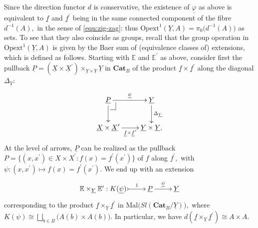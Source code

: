 \documentclass[11pt]{amsart}
\makeatletter
\theoremstyle{plain}
\theoremstyle{definition}
\theoremstyle{remark}
\newcommand{\pullback}[4]{{#1 \leftindex_{#2}{\times}_{#3} #4}}
\newcommand{\un}{\underline}
\def\pullback{%
 \ar@{-}[]+R+<4pt,-3pt>;[]+RD+<4pt,-6pt>%
 \ar@{-}[]+D+<3pt,-6pt>;[]+RD+<4pt,-6pt>}
\def\pullback{%
 \ar@{-}[]+R+<4pt,-3pt>;[]+RD+<4pt,-6pt>%
 \ar@{-}[]+D+<3pt,-6pt>;[]+RD+<4pt,-6pt>}
\makeatother
\begin{document}
Since the direction functor $d$ is conservative, the existence of $\un{\varphi}$ as above is equivalent to $\un{f}$ and $\un{f}^\prime$ being in the same connected component of the fibre $d^{-1}(A),$ in the sense of \eqref{eqn:zig-zag}: thus $\mathrm{Opext}^1(\un{Y},A)=\pi_0\big(d^{-1}(A)\big)$ as sets. To see that they also coincide as groups, recall that the group operation in $\mathrm{Opext}^1(\un{Y},A)$ is given by the Baer sum of (equivalence classes of) extensions, which is defined as follows. Starting with $\mathbb{E}$ and $\mathbb{E}^\prime$ as above, consider first the pullback $\un{P}=(\un{X}\times\un{X}^\prime)\times_{\un{Y}\times\un{Y}}\un{Y}$ in $\mathbf{Cat}_B$ of the product $\un{f}\times\un{f}^\prime$ along the diagonal $\Delta_{\un{Y}}$:
\[
\xymatrix{
{\un{P}} \ar[d] \ar[r]^-{\un{\psi}} \pullback &{\un{Y}} \ar[d]^-{\Delta_{\un{Y}}} \\
{\un{X}\times\un{X}^\prime} \ar[r]_-{\un{f}\times\un{f}^\prime} &{\un{Y}\times\un{Y}.}
}
\]
At the level of arrows, $\un{P}$ can be realized as the pullback $P=\{(x,x^\prime)\in X\times X^\prime:f(x)=f^\prime(x^\prime)\}$ of $f$ along $f^\prime,$ with $\psi\colon(x,x^\prime)\mapsto f(x)=f^\prime(x^\prime).$ We end up with an extension
\begin{equation*}
\xymatrix{{\mathbb{E}\times_{\un{Y}}\mathbb{E}^\prime:K(\un{\psi})} \ar@{>->}[r]^-{\un{\iota}} &{\un{P}} \ar[r]^-{\un{\psi}} &{\un{Y}}}
\end{equation*}
corresponding to the product $\un{f}\times_{\un{Y}}\un{f}^\prime$ in $\mathrm{Mal}\big(Sl(\mathbf{Cat}_B/\un{Y})\big),$ where $K(\psi)\cong\bigsqcup_{b\in B}\big(A(b)\times A(b)\big).$  In particular, we have $d(\un{f}\times_{\un{Y}}\un{f}^\prime)\cong A\times A.$
\end{document}
